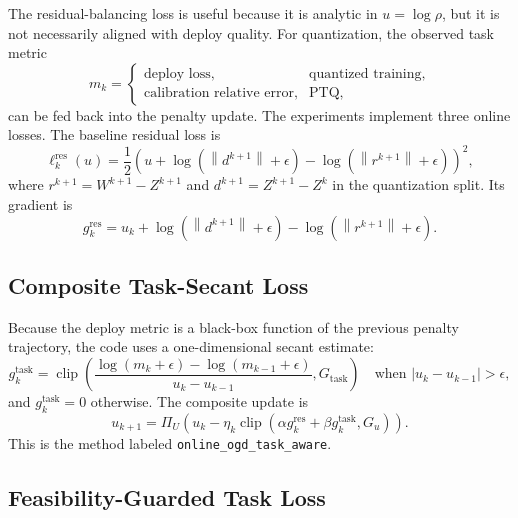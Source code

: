 \documentclass[11pt]{article}
\newcommand{\clip}{\operatorname{clip}}
\newcommand{\norm}[1]{\left\lVert #1 \right\rVert}
\begin{document}
The residual-balancing loss is useful because it is analytic in
\(u=\log\rho\), but it is not necessarily aligned with deploy quality.  For
quantization, the observed task metric
\[
    m_k =
    \begin{cases}
        \text{deploy loss}, & \text{quantized training},\\
        \text{calibration relative error}, & \text{PTQ},
    \end{cases}
\]
can be fed back into the penalty update.  The experiments implement three
online losses.  The baseline residual loss is
\begin{equation}
    \ell_k^{\mathrm{res}}(u)
    =
    \frac{1}{2}
    \left(
        u+\log(\norm{d^{k+1}}+\epsilon)
        -\log(\norm{r^{k+1}}+\epsilon)
    \right)^2,
    \label{eq:res-online-loss-nonconvex}
\end{equation}
where \(r^{k+1}=W^{k+1}-Z^{k+1}\) and
\(d^{k+1}=Z^{k+1}-Z^k\) in the quantization split.  Its gradient is
\begin{equation}
    g_k^{\mathrm{res}}
    =
    u_k+\log(\norm{d^{k+1}}+\epsilon)
    -\log(\norm{r^{k+1}}+\epsilon).
\end{equation}

\subsection{Composite Task-Secant Loss}

Because the deploy metric is a black-box function of the previous penalty
trajectory, the code uses a one-dimensional secant estimate:
\begin{equation}
    g_k^{\mathrm{task}}
    =
    \clip\left(
    \frac{\log(m_k+\epsilon)-\log(m_{k-1}+\epsilon)}
         {u_k-u_{k-1}},
    G_{\mathrm{task}}
    \right)
    \quad \text{when } |u_k-u_{k-1}|>\epsilon,
    \label{eq:task-secant-gradient}
\end{equation}
and \(g_k^{\mathrm{task}}=0\) otherwise.  The composite update is
\begin{equation}
    u_{k+1}
    =
    \Pi_U
    \left(
        u_k-\eta_k
        \clip\left(
            \alpha g_k^{\mathrm{res}}
            +\beta g_k^{\mathrm{task}},
            G_u
        \right)
    \right).
    \label{eq:task-aware-update}
\end{equation}
This is the method labeled \texttt{online\_ogd\_task\_aware}.

\subsection{Feasibility-Guarded Task Loss}
\end{document}
